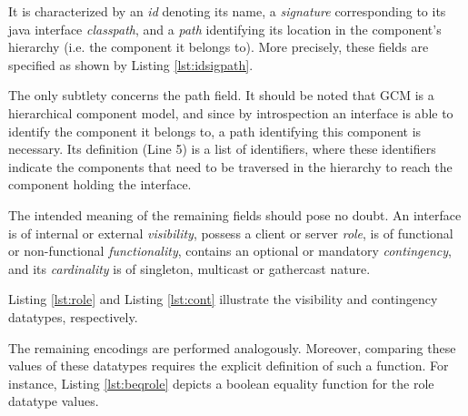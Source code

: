 	\noindent It is characterized by an \textit{id} denoting its name, a \textit{signature} corresponding
	to its java interface \textit{classpath}, and a \textit{path} identifying its location in the component's hierarchy 
	(i.e. the component it belongs to). More precisely, these fields are specified as shown by Listing \ref{lst:idsigpath}.
	
	
	
	
	\noindent The only subtlety concerns the \textsf{path} field. It should be noted that \ac{GCM} is a 
	hierarchical component model, and since by introspection an interface is able to identify the component 
	it belongs to, a \textsf{path} identifying this component is necessary. Its definition (Line 5) is a list of 
	identifiers, where these identifiers indicate the components that need to be traversed in 
	the hierarchy to reach the component holding the interface.	
	
		The intended meaning of the remaining fields should pose no doubt. An interface is of internal or
	external \textit{visibility}, possess a client or server \textit{role}, is of functional or non-functional
	\textit{functionality}, contains an optional or mandatory \textit{contingency}, and its \textit{cardinality}
	is of singleton, multicast or gathercast nature.
	
		Listing \ref{lst:role} and Listing \ref{lst:cont} illustrate the \textsf{visibility}
		and \textsf{contingency} datatypes, respectively.
		
	\begin{figure}[H]
	\begin{minipage}[b]{0.4\linewidth} 
	\centering
	
	\end{minipage}
	\hspace{0.05cm}
	\begin{minipage}[b]{0.55\linewidth} 
	\centering
	
	\end{minipage}
	\end{figure}	  			
				
		
	\noindent The remaining encodings are performed analogously.  Moreover, comparing these
	values of these datatypes requires the explicit definition of such a function. For instance,
	Listing \ref{lst:beqrole} depicts a boolean equality function for the \textsf{role} datatype values.
	
